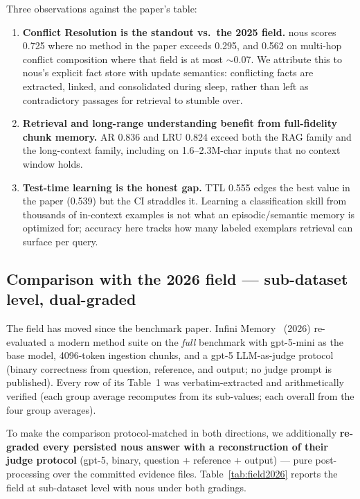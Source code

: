 \documentclass{article}
\newcommand{\nous}{\textsf{nous}}
\begin{document}
Three observations against the paper's table:
\begin{enumerate}
  \item \textbf{Conflict Resolution is the standout vs.\ the 2025 field.}
        \nous{} scores 0.725 where no method in the paper exceeds 0.295, and
        0.562 on multi-hop conflict composition where that field is at most
        $\sim$0.07. We attribute this to \nous{}'s explicit fact store with
        update semantics: conflicting facts are extracted, linked, and
        consolidated during sleep, rather than left as contradictory passages
        for retrieval to stumble over.
  \item \textbf{Retrieval and long-range understanding benefit from
        full-fidelity chunk memory.} AR 0.836 and LRU 0.824 exceed both the
        RAG family and the long-context family, including on 1.6--2.3M-char
        inputs that no context window holds.
  \item \textbf{Test-time learning is the honest gap.} TTL 0.555 edges the
        best value in the paper (0.539) but the CI straddles it. Learning a
        classification skill from thousands of in-context examples is not
        what an episodic/semantic memory is optimized for; accuracy here
        tracks how many labeled exemplars retrieval can surface per query.
\end{enumerate}

\subsection{Comparison with the 2026 field --- sub-dataset level, dual-graded}
\label{sec:field2026}

The field has moved since the benchmark paper. Infini Memory~\cite{infini}
(2026) re-evaluated a modern method suite on the \emph{full} benchmark with
gpt-5-mini as the base model, 4096-token ingestion chunks, and a gpt-5
LLM-as-judge protocol (binary correctness from question, reference, and
output; no judge prompt is published). Every row of its Table~1 was
verbatim-extracted and arithmetically verified (each group average recomputes
from its sub-values; each overall from the four group averages).

To make the comparison protocol-matched in both directions, we additionally
\textbf{re-graded every persisted \nous{} answer with a reconstruction of
their judge protocol} (gpt-5, binary, question + reference + output) --- pure
post-processing over the committed evidence files. Table~\ref{tab:field2026}
reports the field at sub-dataset level with \nous{} under both gradings.
\end{document}
